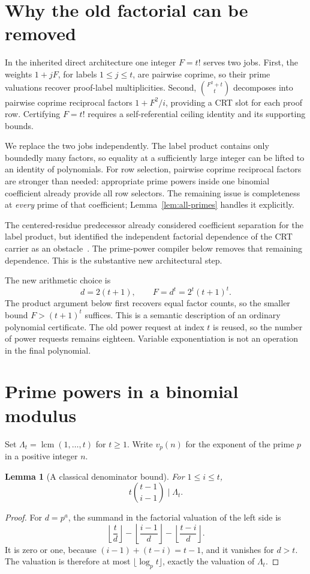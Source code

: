 \documentclass[11pt]{article}
\newtheorem{lemma}[theorem]{Lemma}
\theoremstyle{definition}
\newcommand{\lcm}{\operatorname{lcm}}
\begin{document}
\section{Why the old factorial can be removed}

In the inherited direct architecture one integer $F=t!$ serves two jobs.
First, the weights $1+jF$, for labels $1\le j\le t$, are pairwise coprime,
so their prime valuations recover proof-label multiplicities. Second,
$\binom{F^2+t}{t}$ decomposes into pairwise coprime reciprocal factors
$1+F^2/i$, providing a CRT slot for each proof row. Certifying $F=t!$
requires a self-referential ceiling identity and its supporting bounds.

We replace the two jobs independently. The label product contains only
boundedly many factors, so equality at a sufficiently large integer can be
lifted to an identity of polynomials. For row selection, pairwise coprime
reciprocal factors are stronger than needed: appropriate prime powers
inside one binomial coefficient already provide all row selectors. The
remaining issue is completeness at \emph{every} prime of that coefficient;
Lemma~\ref{lem:all-primes} handles it explicitly.

The centered-residue predecessor already considered coefficient separation
for the label product, but identified the independent factorial dependence
of the CRT carrier as an obstacle~\cite{centered}. The prime-power compiler
below removes that remaining dependence. This is the substantive new
architectural step.

The new arithmetic choice is
\begin{equation}\label{eq:power-F}
 d=2(t+1),\qquad F=d^t=2^t(t+1)^t.
\end{equation}
The product argument below first recovers equal factor counts, so the
smaller bound $F>(t+1)^t$ suffices.
This is a semantic description of an ordinary polynomial certificate.
The old power request at index $t$ is reused, so the number of power
requests remains eighteen. Variable exponentiation is not an operation
in the final polynomial.

\section{Prime powers in a binomial modulus}

Set $\Lambda_t=\lcm(1,\ldots,t)$ for $t\ge1$. Write $v_p(n)$ for
the exponent of the prime $p$ in a positive integer $n$.

\begin{lemma}[A classical denominator bound]\label{lem:lcm}
For $1\le i\le t$,
\[
 t\binom{t-1}{i-1}\mid\Lambda_t.
\]
\end{lemma}
\begin{proof}
For $d=p^a$, the summand in the factorial valuation of the left side is
\[
 \left\lfloor\frac{t}{d}\right\rfloor
 -\left\lfloor\frac{i-1}{d}\right\rfloor
 -\left\lfloor\frac{t-i}{d}\right\rfloor.
\]
It is zero or one, because $(i-1)+(t-i)=t-1$, and it vanishes for $d>t$.
The valuation is therefore at most $\lfloor\log_p t\rfloor$, exactly
the valuation of $\Lambda_t$.
\end{proof}
\end{document}
